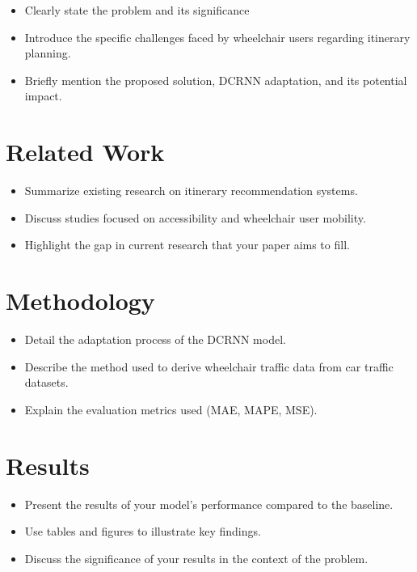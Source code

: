 \documentclass[conference]{IEEEtran}
\begin{document}
    \begin{itemize}
        \item Clearly state the problem and its significance
        \item Introduce the specific challenges faced by wheelchair users regarding itinerary planning.
        \item Briefly mention the proposed solution, DCRNN adaptation, and its potential impact.
    \end{itemize}


    \section{Related Work}\label{sec:related-work}

    \begin{itemize}
        \item Summarize existing research on itinerary recommendation systems.
        \item Discuss studies focused on accessibility and wheelchair user mobility.
        \item Highlight the gap in current research that your paper aims to fill.
    \end{itemize}


    \section{Methodology}\label{sec:methodology}

    \begin{itemize}
        \item Detail the adaptation process of the DCRNN model.
        \item Describe the method used to derive wheelchair traffic data from car traffic datasets.
        \item Explain the evaluation metrics used (MAE, MAPE, MSE).
    \end{itemize}


    \section{Results}\label{sec:results}

    \begin{itemize}
        \item Present the results of your model's performance compared to the baseline.
        \item Use tables and figures to illustrate key findings.
        \item Discuss the significance of your results in the context of the problem.
    \end{itemize}
\end{document}
